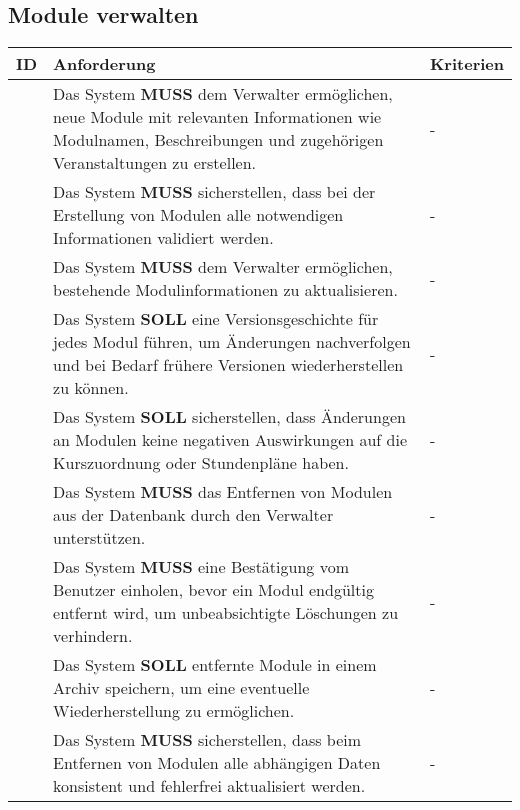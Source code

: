 \subsection{Module verwalten}
\begin{tabular} {|p{}|p{}|p{}|}
	\hline
	ID & Anforderung & Kriterien \\
	\hline
	\printfreqnr
	& Das System \textbf{MUSS} dem Verwalter ermöglichen, neue Module mit relevanten Informationen wie Modulnamen, Beschreibungen und zugehörigen Veranstaltungen zu erstellen. 
	& - \\
	\hline
	\printfreqnr
	& Das System \textbf{MUSS} sicherstellen, dass bei der Erstellung von Modulen alle notwendigen Informationen validiert werden. 
	& - \\
	\hline
	\printfreqnr
	& Das System \textbf{MUSS} dem Verwalter ermöglichen, bestehende Modulinformationen zu aktualisieren. 
	& - \\
	\hline
	\printfreqnr
	& Das System \textbf{SOLL} eine Versionsgeschichte für jedes Modul führen, um Änderungen nachverfolgen und bei Bedarf frühere Versionen wiederherstellen zu können. 
	& - \\
	\hline
	\printfreqnr
	& Das System \textbf{SOLL} sicherstellen, dass Änderungen an Modulen keine negativen Auswirkungen auf die Kurszuordnung oder Stundenpläne haben. 
	& - \\
	\hline
	\printfreqnr
	& Das System \textbf{MUSS} das Entfernen von Modulen aus der Datenbank durch den Verwalter unterstützen. 
	& - \\
	\hline
	\printfreqnr
	& Das System \textbf{MUSS} eine Bestätigung vom Benutzer einholen, bevor ein Modul endgültig entfernt wird, um unbeabsichtigte Löschungen zu verhindern. 
	& - \\
	\hline
	\printfreqnr
	& Das System \textbf{SOLL} entfernte Module in einem Archiv speichern, um eine eventuelle Wiederherstellung zu ermöglichen. 
	& - \\
	\hline
	\printfreqnr
	& Das System \textbf{MUSS} sicherstellen, dass beim Entfernen von Modulen alle abhängigen Daten konsistent und fehlerfrei aktualisiert werden. 
	& - \\
	\hline
\end{tabular}

\newpage

